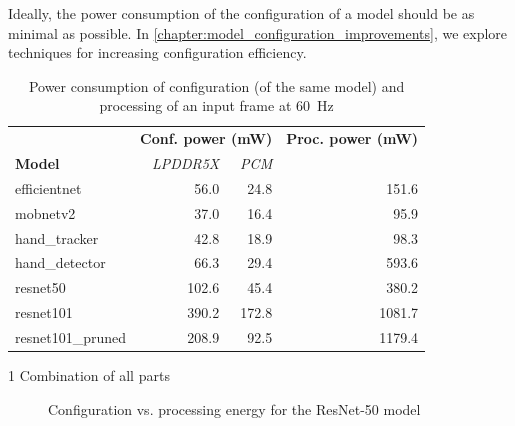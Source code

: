 Ideally, the power consumption of the configuration of a model should be as minimal as possible.
In \cref{chapter:model_configuration_improvements}, we explore techniques for increasing configuration efficiency.

\begin{table}[]
    \centering
    \begin{threeparttable}
        \begin{tabular}{@{}lrrr@{}}
            \toprule
                                       & \multicolumn{2}{l}{\textbf{Conf. power (mW)}} & \textbf{Proc. power (mW)} \\ \cmidrule(l){2-3} 
            \textbf{Model}             & \textit{LPDDR5X}  & \textit{PCM}    & \\ \midrule
            efficientnet               & 56.0              & 24.8            & 151.6 \\
            mobnetv2                   & 37.0              & 16.4            & 95.9 \\
            hand\_tracker              & 42.8              & 18.9            & 98.3 \\
            hand\_detector             & 66.3              & 29.4            & 593.6 \\
            resnet50                   & 102.6             & 45.4            & 380.2 \\
            resnet101\tnote{1}         & 390.2             & 172.8           & 1081.7 \\
            resnet101\_pruned\tnote{1} & 208.9             & 92.5            & 1179.4 \\ \bottomrule
        \end{tabular}
        \begin{tablenotes}
            \item[1] Combination of all parts
        \end{tablenotes}
    \end{threeparttable}
    \caption{Power consumption of configuration (of the same model) and processing of an input frame at \SI{60}{Hz}}
    \label{tab:example_models_power_consumption}
\end{table}

\begin{figure}[hbtp]
    \centering
    \hfill
    \caption{Configuration vs. processing energy for the ResNet-50 model}
    \label{fig:resnet50_conf_proc}
\end{figure}

